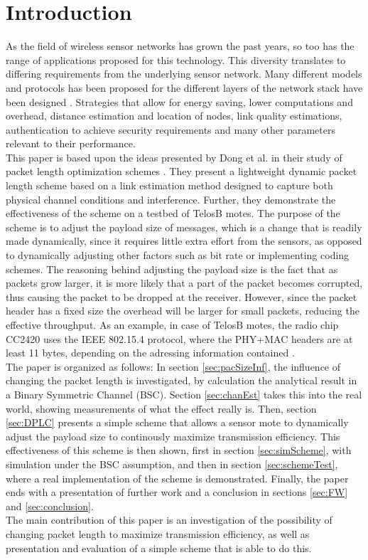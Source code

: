 \section{Introduction}\label{sec:intro}
As the field of wireless sensor networks has grown the past years, so too has the range of applications proposed for this technology. This diversity translates to differing requirements from the underlying sensor network. Many different models and protocols has been proposed for the different layers of the
network stack have been designed \cite{WSNpaper}. Strategies that allow for energy saving, lower computations  and overhead, distance estimation and location of nodes, link quality estimations, authentication to achieve security requirements and many other parameters relevant to their performance.
\\[8pt]
This paper is based upon the ideas presented by Dong et al. in their study of packet length optimization schemes \cite{DPLCpaper}. They present a lightweight dynamic packet length scheme based on a link estimation method designed to capture both physical channel conditions and interference. Further, they demonstrate the effectiveness of the scheme on a testbed of TelosB motes. The purpose of the scheme is to adjust the payload size of messages, which is a change that is readily made dynamically, since it requires little extra effort from the sensors, as opposed to dynamically adjusting other factors such as bit rate or implementing coding schemes. The reasoning behind adjusting the payload size is the fact that as packets grow larger, it is more likely that a part of the packet becomes corrupted, thus causing the packet to be dropped at the receiver. However, since the packet header has a fixed size the overhead will be larger for small packets, reducing the effective throughput. As an example, in case of TelosB motes, the radio chip CC2420 uses the IEEE 802.15.4 protocol, where the PHY+MAC headers are at least 11 bytes, depending on the adressing information contained \cite{CC2420}.
\\[8pt]
The paper is organized as follows: In section \ref{sec:pacSizeInf}, the influence of changing the packet length is investigated, by calculation the analytical result in a Binary Symmetric Channel (BSC). Section \ref{sec:chanEst} takes this into the real world, showing measurements of what the effect really is. Then, section \ref{sec:DPLC} presents a simple scheme that allows a sensor mote to dynamically adjust the payload size to continously maximize transmission efficiency. This effectiveness of this scheme is then shown, first in section \ref{sec:simScheme}, with simulation under the BSC assumption, and then in section \ref{sec:schemeTest}, where a real implementation of the scheme is demonstrated. Finally, the paper ends with a presentation of further work and a conclusion in sections \ref{sec:FW} and \ref{sec:conclusion}.
\\[8pt]
The main contribution of this paper is an investigation of the possibility of changing packet length to maximize transmission efficiency, as well as presentation and evaluation of a simple scheme that is able to do this.
